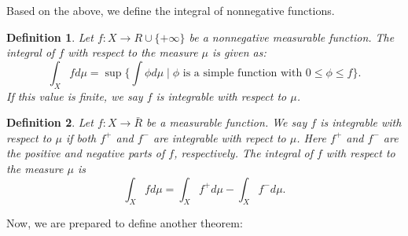 \documentclass[12pt]{amsart}
\newtheorem{definition}{Definition}
\theoremstyle{plain}
\theoremstyle{definition}
\theoremstyle{remark}
\numberwithin{equation}{section}
\numberwithin{thm}{section}
\begin{document}
Based on the above, we define the integral of nonnegative functions.
\begin{definition}
    Let $f: X \to R \cup \{ +\infty \}$ be a nonnegative measurable function. The integral of $f$ with respect to the measure $\mu$ is given as:
    \begin{equation*}
        \int_X f d\mu = \sup\{\int\phi  d\mu  \mid  \phi \text{  is a simple function with  } 0 \leq \phi \leq f \}.
    \end{equation*}
 If this value is finite, we say $f$ is integrable with respect to $\mu$.
\end{definition}
\begin{definition}
    Let $f: X \to \bar{R}$ be a measurable function. We say $f$ is integrable with respect to $\mu$ if both $f^+$ and $f^-$ are integrable with repect to $\mu$. Here $f^+$ and $f^-$ are the positive and negative parts of $f$, respectively. The integral of $f$ with respect to the measure $\mu$ is
    \begin{equation*}
        \int_{X} f d\mu = \int_X f^+ d\mu - \int_X f^- d\mu.
    \end{equation*}
\end{definition}

Now, we are prepared to define another theorem: 
\end{document}
